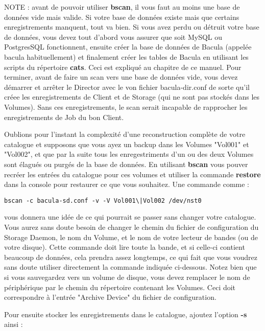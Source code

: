 NOTE : avant de pouvoir utiliser {\bf bscan}, il vous faut au moins une base
de données vide mais valide.  Si votre base de données existe mais que certains
enregistrements manquent, tout va bien. Si vous avez perdu ou détruit votre base
de données, vous devez tout d'abord vous assurer que soit MySQL ou PostgresSQL
fonctionnent, ensuite créer la base de données de Bacula (appelée bacula
habituellement) et finalement créer les tables de Bacula en utilisant les
scripts du répertoire {\bf cats}.  Ceci est expliqué au chapitre
 de ce  manuel. Pour terminer, avant de 
faire un scan vers une base de données vide, vous devez démarrer et arrêter
le Director avec le von fichier bacula-dir.conf de sorte qu'il créee les 
enregistrements de Client et de Storage (qui ne sont pas stockés dans les
Volumes). Sans ces enregistrements, le scan serait incapable de rapprocher
les enregistrements de Job du bon Client.

Oublions pour l'instant la complexité d'une reconstruction complète de votre
catalogue et supposons que vous ayez un backup dans les Volumes "Vol001" 
et "Vol002", et que par la suite tous les enregestriments d'un ou des deux
Volumes sont élagués ou purgés de la base de données. En utilisant {\bf bscan} 
vous pouver recréer les entrées du catalogue pour ces volumes et utiliser
la commande {\bf restore} dans la console pour restaurer ce que vous souhaitez.
Une commande comme : 

\footnotesize
\begin{verbatim}
bscan -c bacula-sd.conf -v -V Vol001\|Vol002 /dev/nst0
\end{verbatim}
\normalsize

vous donnera une idée de ce qui pourrait se passer sans changer votre catalogue.
Vous aurez sans doute besoin de changer le chemin du fichier de configuration
du Storage Daemon, le nom du Volume, et le nom de votre lecteur de bandes (ou
de votre disque). Cette commande doit lire toute la bande, et si celle-ci 
contient beaucoup de données, cela prendra assez longtemps, ce qui fait que
vous voudrez sans doute utiliser directement la commande indiquée ci-dessous.
Notez bien que si vous sauvegardez vers un volume de disque, vous devez 
remplacer le nom de périphérique par le chemin du répertoire contenant les 
Volumes. Ceci doit correspondre à l'entrée "Archive Device" du fichier de 
configuration.

Pour ensuite stocker les enregistrements dans le catalogue, ajoutez l'option
{\bf -s} ainsi : 

